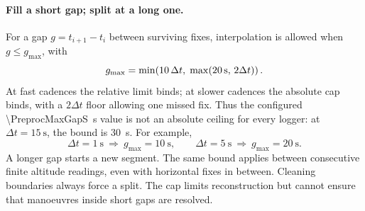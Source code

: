 \paragraph{Fill a short gap; split at a long one.}
For a gap $g=t_{i+1}-t_i$ between surviving fixes, interpolation is allowed when
$g\le g_{\max}$, with
\begin{equation}
 g_{\max}=\min\!\left(
   10\,\Delta t,\;
   \max\!\left(\SI{20}{\second},\,2\Delta t\right)\right).
 \label{eq:uniform-gap-bound}
\end{equation}
At fast cadences the relative limit binds; at slower cadences the absolute cap
binds, with a $2\Delta t$ floor allowing one missed fix. Thus the configured
\SI{\PreprocMaxGapS}{\second} value is not an absolute ceiling for every logger:
at $\Delta t=\SI{15}{\second}$, the bound is \SI{30}{\second}. For example,
\[
 \Delta t=\SI{1}{\second}\ \Rightarrow\ g_{\max}=\SI{10}{\second},
 \qquad
 \Delta t=\SI{5}{\second}\ \Rightarrow\ g_{\max}=\SI{20}{\second}.
\]
A longer gap starts a new segment. The same bound applies between consecutive
finite altitude readings, even with horizontal fixes in between. Cleaning
boundaries always force a split. The cap limits reconstruction but cannot ensure
that manoeuvres inside short gaps are resolved.

